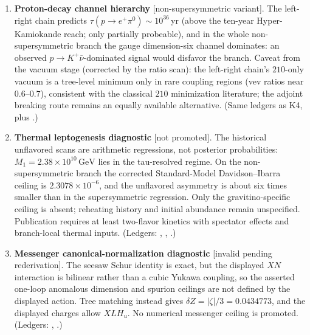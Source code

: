 \documentclass[
  aps,
  prd,
  preprint,
  nofootinbib,
  superscriptaddress,
  longbibliography
]{revtex4-2}
\begin{document}
\begin{enumerate}
\item[K5.] \textbf{Proton-decay channel hierarchy} [non-supersymmetric
variant].  The left-right chain predicts
\(\tau(p\to e^+\pi^0)\sim10^{36}\,\)yr (above the ten-year
Hyper-Kamiokande reach; only partially probeable), and in the whole
non-supersymmetric branch the gauge dimension-six channel dominates: an
observed \(p\to K^+\bar\nu\)-dominated signal would disfavor the
branch.  Caveat from the vacuum stage (corrected by the ratio scan):
the left-right chain's \(210\)-only vacuum is a tree-level minimum
only in rare coupling regions (vev ratios near \(0.6\)--\(0.7\)),
consistent with the classical \(210\) minimization literature; the
adjoint breaking route remains an equally available alternative.
(Same ledgers as K4, plus
.)

\item[K6.] \textbf{Thermal leptogenesis diagnostic} [not promoted].
The historical unflavored scans are arithmetic regressions, not posterior
probabilities: \(M_1=2.38\times10^{10}\,\mathrm{GeV}\) lies in the
tau-resolved regime.  On the non-supersymmetric branch the corrected
Standard-Model Davidson--Ibarra ceiling is
\(2.3078\times10^{-6}\), and the unflavored asymmetry is about six times
smaller than in the supersymmetric regression.  Only the
gravitino-specific ceiling is absent; reheating history and initial abundance
remain unspecified.  Publication requires at least two-flavor kinetics with
spectator effects and branch-local thermal inputs.
(Ledgers: ,
,
.)

\item[K7.] \textbf{Messenger canonical-normalization diagnostic}
[invalid pending rederivation].  The seesaw Schur identity is exact, but the
displayed \(XN\) interaction is bilinear rather than a cubic Yukawa coupling,
so the asserted one-loop anomalous dimension and spurion ceilings are not
defined by the displayed action.  Tree matching instead gives
\(\delta Z=|\zeta|/3=0.0434773\), and the displayed charges allow
\(XLH_u\).  No numerical messenger ceiling is promoted.
(Ledgers: ,
.)


\end{enumerate}
\end{document}
